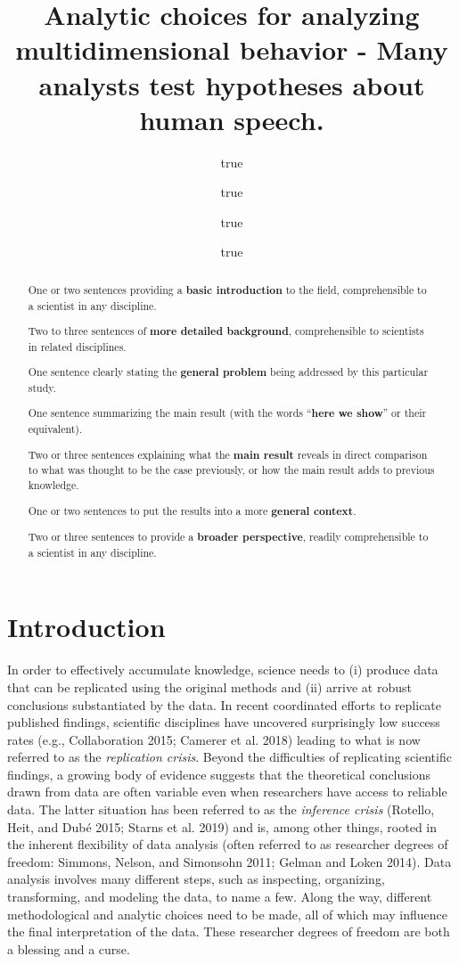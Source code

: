 \documentclass[
  12pt,
]{article}
\title{Analytic choices for analyzing multidimensional behavior - Many analysts test hypotheses about human speech.}
\author{true \and true \and true \and true}
\date{}
\begin{document}
\maketitle
\begin{abstract}
One or two sentences providing a \textbf{basic introduction} to the field, comprehensible to a scientist in any discipline.

Two to three sentences of \textbf{more detailed background}, comprehensible to scientists in related disciplines.

One sentence clearly stating the \textbf{general problem} being addressed by this particular study.

One sentence summarizing the main result (with the words ``\textbf{here we show}'' or their equivalent).

Two or three sentences explaining what the \textbf{main result} reveals in direct comparison to what was thought to be the case previously, or how the main result adds to previous knowledge.

One or two sentences to put the results into a more \textbf{general context}.

Two or three sentences to provide a \textbf{broader perspective}, readily comprehensible to a scientist in any discipline.
\end{abstract}

{
\setcounter{tocdepth}{2}
\tableofcontents
}
\hypertarget{introduction}{%
\section{Introduction}\label{introduction}}

In order to effectively accumulate knowledge, science needs to (i) produce data that can be replicated using the original methods and (ii) arrive at robust conclusions substantiated by the data.
In recent coordinated efforts to replicate published findings, scientific disciplines have uncovered surprisingly low success rates (e.g., Collaboration 2015; Camerer et al. 2018) leading to what is now referred to as the \emph{replication crisis}.
Beyond the difficulties of replicating scientific findings, a growing body of evidence suggests that the theoretical conclusions drawn from data are often variable even when researchers have access to reliable data.
The latter situation has been referred to as the \emph{inference crisis} (Rotello, Heit, and Dubé 2015; Starns et al. 2019) and is, among other things, rooted in the inherent flexibility of data analysis (often referred to as researcher degrees of freedom: Simmons, Nelson, and Simonsohn 2011; Gelman and Loken 2014).
Data analysis involves many different steps, such as inspecting, organizing, transforming, and modeling the data, to name a few.
Along the way, different methodological and analytic choices need to be made, all of which may influence the final interpretation of the data.
These researcher degrees of freedom are both a blessing and a curse.
\end{document}
